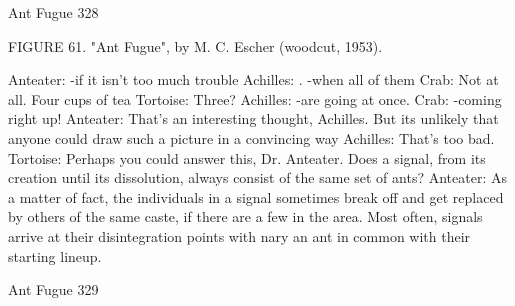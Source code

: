 Ant Fugue                                                                                 328

              FIGURE 61. "Ant Fugue", by M. C. Escher (woodcut, 1953).

Anteater: -if it isn't too much trouble
Achilles: . -when all of them
Crab: Not at all. Four cups of tea
Tortoise: Three?
Achilles: -are going at once.
Crab: -coming right up!
Anteater: That's an interesting thought, Achilles. But its unlikely that anyone could draw
    such a picture in a convincing way
Achilles: That's too bad.
Tortoise: Perhaps you could answer this, Dr. Anteater. Does a signal, from its creation
    until its dissolution, always consist of the same set of ants?
Anteater: As a matter of fact, the individuals in a signal sometimes break off and get
    replaced by others of the same caste, if there are a few in the area. Most often, signals
    arrive at their disintegration points with nary an ant in common with their starting
    lineup.




Ant Fugue                                                                                329

